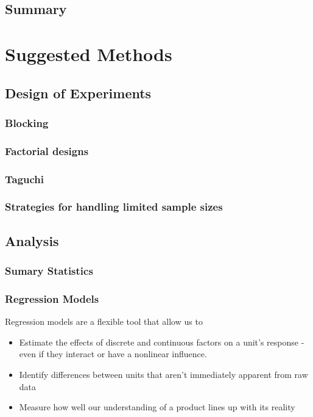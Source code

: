 \documentclass[11pt,a4paper,article]{memoir} %
\begin{document}
\section{Summary}

\newpage


\chapter{Suggested Methods}
\section{Design of Experiments}
\subsection{Blocking}
\subsection{Factorial designs}
\subsection{Taguchi}
\subsection{Strategies for handling limited sample sizes}

\section{Analysis}
\subsection{Sumary Statistics}
\subsection{Regression Models}
Regression models are a flexible tool that allow us to
\begin{itemize}
\item Estimate the effects of discrete and continuous factors on a unit's response - even if they interact or have a nonlinear influence.
\item Identify differences between units that aren't immediately apparent from raw data
\item Measure how well our understanding of a product lines up with its reality
\end{itemize}
\end{document}
